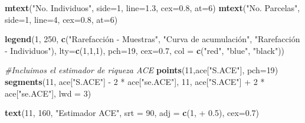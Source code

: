 \documentclass[]{book}
\newenvironment{Shaded}{\begin{snugshade}}{\end{snugshade}}
\newcommand{\KeywordTok}[1]{\textcolor[rgb]{0.13,0.29,0.53}{\textbf{{#1}}}}
\newcommand{\DataTypeTok}[1]{\textcolor[rgb]{0.13,0.29,0.53}{{#1}}}
\newcommand{\DecValTok}[1]{\textcolor[rgb]{0.00,0.00,0.81}{{#1}}}
\newcommand{\FloatTok}[1]{\textcolor[rgb]{0.00,0.00,0.81}{{#1}}}
\newcommand{\StringTok}[1]{\textcolor[rgb]{0.31,0.60,0.02}{{#1}}}
\newcommand{\CommentTok}[1]{\textcolor[rgb]{0.56,0.35,0.01}{\textit{{#1}}}}
\newcommand{\NormalTok}[1]{{#1}}
\begin{document}
\begin{Shaded}
\begin{Highlighting}[]
\KeywordTok{mtext}\NormalTok{(}\StringTok{"No. Individuos"}\NormalTok{, }\DataTypeTok{side=}\DecValTok{1}\NormalTok{, }\DataTypeTok{line=}\FloatTok{1.3}\NormalTok{, }\DataTypeTok{cex=}\FloatTok{0.8}\NormalTok{, }\DataTypeTok{at=}\DecValTok{6}\NormalTok{)}
\KeywordTok{mtext}\NormalTok{(}\StringTok{"No. Parcelas"}\NormalTok{, }\DataTypeTok{side=}\DecValTok{1}\NormalTok{, }\DataTypeTok{line=}\DecValTok{4}\NormalTok{, }\DataTypeTok{cex=}\FloatTok{0.8}\NormalTok{, }\DataTypeTok{at=}\DecValTok{6}\NormalTok{)}

\KeywordTok{legend}\NormalTok{(}\DecValTok{1}\NormalTok{, }\DecValTok{250}\NormalTok{, }\KeywordTok{c}\NormalTok{(}\StringTok{"Rarefacción - Muestras"}\NormalTok{, }\StringTok{"Curva de acumulación"}\NormalTok{,}
                 \StringTok{"Rarefacción - Individuos"}\NormalTok{), }\DataTypeTok{lty=}\KeywordTok{c}\NormalTok{(}\DecValTok{1}\NormalTok{,}\DecValTok{1}\NormalTok{,}\DecValTok{1}\NormalTok{), }\DataTypeTok{pch=}\DecValTok{19}\NormalTok{,}
       \DataTypeTok{cex=}\FloatTok{0.7}\NormalTok{, }\DataTypeTok{col =} \KeywordTok{c}\NormalTok{(}\StringTok{"red"}\NormalTok{, }\StringTok{"blue"}\NormalTok{, }\StringTok{"black"}\NormalTok{))}

\CommentTok{#Incluimos el estimador de riqueza ACE}
\KeywordTok{points}\NormalTok{(}\DecValTok{11}\NormalTok{,ace[}\StringTok{"S.ACE"}\NormalTok{], }\DataTypeTok{pch=}\DecValTok{19}\NormalTok{)}
\KeywordTok{segments}\NormalTok{(}\DecValTok{11}\NormalTok{, ace[}\StringTok{"S.ACE"}\NormalTok{] -}\StringTok{ }\DecValTok{2} \NormalTok{*}\StringTok{ }\NormalTok{ace[}\StringTok{"se.ACE"}\NormalTok{], }
         \DecValTok{11}\NormalTok{, ace[}\StringTok{"S.ACE"}\NormalTok{] +}\StringTok{ }\DecValTok{2} \NormalTok{*}\StringTok{ }\NormalTok{ace[}\StringTok{"se.ACE"}\NormalTok{], }\DataTypeTok{lwd =} \DecValTok{3}\NormalTok{) }

\KeywordTok{text}\NormalTok{(}\DecValTok{11}\NormalTok{, }\DecValTok{160}\NormalTok{, }\StringTok{"Estimador ACE"}\NormalTok{, }\DataTypeTok{srt =} \DecValTok{90}\NormalTok{, }\DataTypeTok{adj =} \KeywordTok{c}\NormalTok{(}\DecValTok{1}\NormalTok{, +}\StringTok{ }\FloatTok{0.5}\NormalTok{), }\DataTypeTok{cex=}\FloatTok{0.7}\NormalTok{)}


\end{Highlighting}
\end{Shaded}
\end{document}

